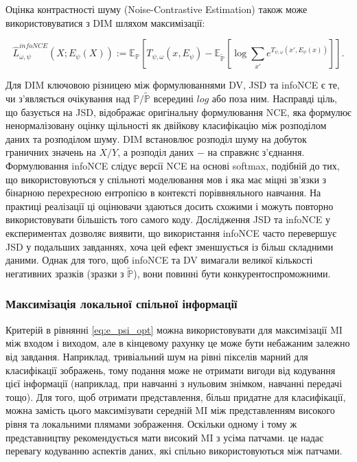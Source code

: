 Оцінка контрастності шуму (Noise-Contrastive Estimation) також може використовуватися з DIM шляхом максимізації:

\begin{equation}\label{eq:dim}
\hat{L}_{\omega,\psi}^{infoNCE}(X; E_{\psi}(X)) := \mathbb{E_{P}}\left[T_{\psi,\omega}(x, E_{\psi}) - \mathbb{E_{\tilde{P}}}\left[\log{\sum_{x'}{e^{T_{\psi, \omega}(x', E_{\psi}(x))}}}\right]\right].
\end{equation}

\vspace{1.5em}

Для DIM ключовою різницею між формулюваннями DV, JSD та infoNCE є те, чи з'являється очікування над $\mathbb{P / \tilde{P}}$ всередині $log$ або поза ним. Насправді ціль, що базується на JSD, відображає оригінальну формулювання NCE, яка формулює ненормалізовану оцінку щільності як двійкову класифікацію між розподілом даних та розподілом шуму. DIM встановлює розподіл шуму на добуток граничних значень на $X / Y$, а розподіл даних $-$ на справжнє з'єднання. Формулювання infoNCE слідує версії NCE на основі softmax, подібній до тих, що використовуються у спільноті моделювання мов і яка має міцні зв'язки з бінарною перехресною ентропією в контексті поріввняльного навчання. На практиці реалізації ці оцінювачи здаються досить схожими і можуть повторно використовувати більшість того самого коду. Дослідження JSD та infoNCE у експериментах дозволяє виявити, що використання infoNCE часто перевершує JSD у подальших завданнях, хоча цей ефект зменшується із більш складними даними. Однак для того, щоб infoNCE та DV вимагали великої кількості негативних зразків (зразки з $\mathbb{\tilde{P}}$), вони повинні бути конкурентоспроможними.

\subsubsection{Максимізація локальної спільної інформації}

Критерій в рівнянні \ref{eq:e_psi_opt}  можна використовувати для максимізації MI між входом і виходом, але в кінцевому рахунку це може бути небажаним залежно від завдання. Наприклад, тривіальний шум на рівні пікселів марний для класифікації зображень, тому подання може не отримати вигоди від кодування цієї інформації (наприклад, при навчанні з нульовим знімком, навчанні передачі тощо). Для того, щоб отримати представлення, більш придатне для класифікації, можна замість цього максимізувати середній MI між представленням високого рівня та локальними плямами зображення. Оскільки одному і тому ж представництву рекомендується мати високий MI з усіма патчами. це надає перевагу кодуванню аспектів даних, які спільно використовуються між патчами.

